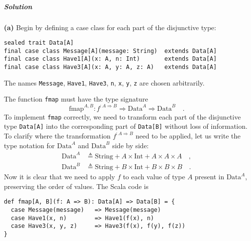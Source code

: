 \subparagraph{Solution}

\textbf{(a)} Begin by defining a case class for each part of the disjunctive
type:
\begin{lstlisting}
sealed trait Data[A] 
final case class Message[A](message: String)  extends Data[A]
final case class Have1[A](x: A, n: Int)       extends Data[A]  
final case class Have3[A](x: A, y: A, z: A)   extends Data[A]
\end{lstlisting}
The names \lstinline!Message!, \lstinline!Have1!, \lstinline!Have3!,
\lstinline!n!, \lstinline!x!, \lstinline!y!, \lstinline!z! are
chosen arbitrarily. 

The function \lstinline!fmap! must have the type signature
\[
\text{fmap}^{A,B}:f^{:A\Rightarrow B}\Rightarrow\text{Data}^{A}\Rightarrow\text{Data}^{B}\quad.
\]
To implement \lstinline!fmap! correctly, we need to transform each
part of the disjunctive type \lstinline!Data[A]! into the corresponding
part of \lstinline!Data[B]! without loss of information. To clarify
where the transformation $f^{:A\Rightarrow B}$ need to be applied,
let us write the type notation for $\text{Data}^{A}$ and $\text{Data}^{B}$
side by side:
\begin{align*}
\text{Data}^{A} & \triangleq\text{String}+A\times\text{Int}+A\times A\times A\quad,\\
\text{Data}^{B} & \triangleq\text{String}+B\times\text{Int}+B\times B\times B\quad.
\end{align*}
Now it is clear that we need to apply $f$ to each value of type $A$
present in $\text{Data}^{A}$, preserving the order of values. The
Scala code is
\begin{lstlisting}
def fmap[A, B](f: A => B): Data[A] => Data[B] = {
  case Message(message)   => Message(message)
  case Have1(x, n)        => Have1(f(x), n)
  case Have3(x, y, z)     => Have3(f(x), f(y), f(z))
}
\end{lstlisting}

